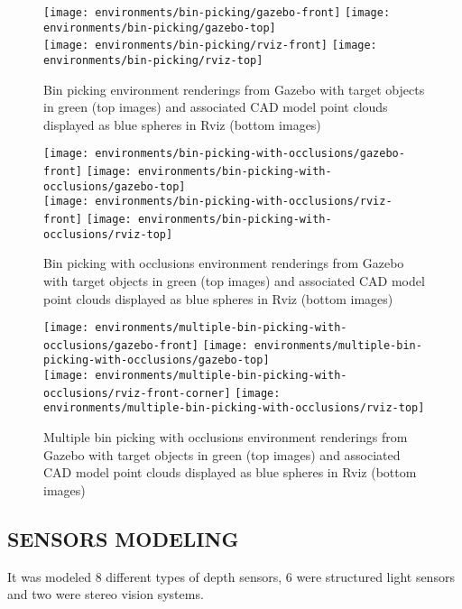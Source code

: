 \begin{figure}
	\centering
	\texttt{[image: environments/bin-picking/gazebo-front]}
	\texttt{[image: environments/bin-picking/gazebo-top]}\\
	\texttt{[image: environments/bin-picking/rviz-front]}
	\texttt{[image: environments/bin-picking/rviz-top]}
	\caption{Bin picking environment renderings from Gazebo with target objects in green (top images) and associated CAD model point clouds displayed as blue spheres in Rviz (bottom images)}
\end{figure}

\begin{figure}
	\centering
	\texttt{[image: environments/bin-picking-with-occlusions/gazebo-front]}
	\texttt{[image: environments/bin-picking-with-occlusions/gazebo-top]}\\
	\texttt{[image: environments/bin-picking-with-occlusions/rviz-front]}
	\texttt{[image: environments/bin-picking-with-occlusions/rviz-top]}
	\caption{Bin picking with occlusions environment renderings from Gazebo with target objects in green (top images) and associated CAD model point clouds displayed as blue spheres in Rviz (bottom images)}
\end{figure}

\begin{figure}
	\centering
	\texttt{[image: environments/multiple-bin-picking-with-occlusions/gazebo-front]}
	\texttt{[image: environments/multiple-bin-picking-with-occlusions/gazebo-top]}\\
	\texttt{[image: environments/multiple-bin-picking-with-occlusions/rviz-front-corner]}
	\texttt{[image: environments/multiple-bin-picking-with-occlusions/rviz-top]}
	\caption{Multiple bin picking with occlusions environment renderings from Gazebo with target objects in green (top images) and associated CAD model point clouds displayed as blue spheres in Rviz (bottom images)}
\end{figure}


\subsection{\uppercase{Sensors modeling}}

It was modeled 8 different types of depth sensors, 6 were structured light sensors and two were stereo vision systems.

